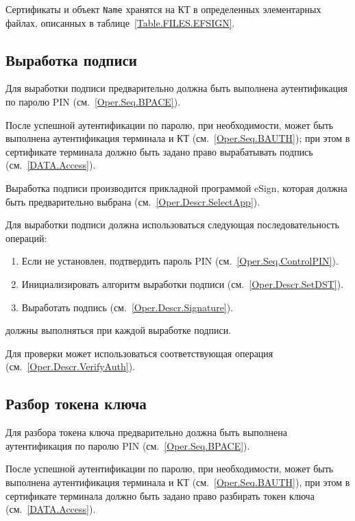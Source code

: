 Сертификаты и объект \texttt{Name} 
хранятся на КТ в определенных элементарных файлах, 
описанных в таблице~\ref{Table.FILES.EFSIGN}.

\subsection{Выработка подписи}
\label{Oper.Seq.Sig}

Для выработки подписи предварительно 
должна быть выполнена аутентификация по 
паролю PIN (см.~\ref{Oper.Seq.BPACE}).

После успешной аутентификации по паролю,
при необходимости, может быть выполнена 
аутентификация терминала и КТ (см.~\ref{Oper.Seq.BAUTH});
при этом в сертификате терминала должно быть задано право
вырабатывать подпись (см.~\ref{DATA.Access}).

Выработка подписи производится прикладной программой eSign, которая
должна быть предварительно выбрана (см.~\ref{Oper.Descr.SelectApp}).

Для выработки подписи  должна использоваться 
следующая последовательность операций:
%
\begin{enumerate}
\item Если  не установлен,
      подтвердить пароль PIN (см.~\ref{Oper.Seq.ControlPIN}).
\item Инициализировать алгоритм выработки подписи (см.~\ref{Oper.Descr.SetDST}).
\item Выработать подпись (см.~\ref{Oper.Descr.Signature}).
\end{enumerate}
%
 должны выполняться
при каждой выработке подписи.

Для проверки  может использоваться 
соответствующая операция (см.~\ref{Oper.Descr.VerifyAuth}).

\subsection{Разбор токена ключа}
\label{Oper.Seq.Decipher}

Для разбора токена ключа предварительно 
должна быть выполнена аутентификация по 
паролю PIN (см.~\ref{Oper.Seq.BPACE}).

После успешной аутентификации по паролю,
при необходимости, может быть выполнена аутентификация 
терминала и КТ (см.~\ref{Oper.Seq.BAUTH}),
при этом в сертификате терминала должно быть задано право
разбирать токен ключа (см.~\ref{DATA.Access}).

